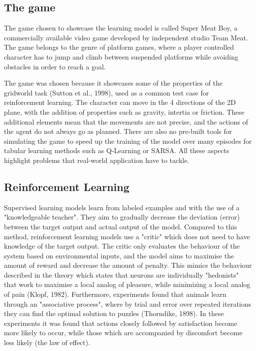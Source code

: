 \documentclass[10pt]{article}
\begin{document}
    \subsection{The game}

    The game chosen to showcase the learning model is called Super Meat Boy, a commercially available video game developed by independent studio Team Meat. The game belongs to the genre of platform games, where a player controlled character has to jump and climb between suspended platforms while avoiding obstacles in order to reach a goal.   

    The game was chosen because it showcases some of the properties of the gridworld task (Sutton et al., 1998), used as a common test case for reinforcement learning. The character can move in the 4 directions of the 2D plane, with the addition of properties such as gravity, intertia or friction. These additional elements mean that the movements are not precise, and the actions of the agent do not always go as planned. There are also no pre-built tools for simulating the game to speed up the training of the model over many episodes for tabular learning methods such as Q-Learning or SARSA. All these aspects highlight problems that real-world application have to tackle.

    \subsection{Reinforcement Learning}

    Supervised learning models learn from labeled examples and with the use of a "knowledgeable teacher". They aim to gradually decrease the deviation (error) between the target output and actual output of the model. Compared to this method, reinforcement learning models use a "critic" which does not need to have knowledge of the target output. The critic only evaluates the behaviour of the system based on environmental inputs, and the model aims to maximise the amount of reward and decrease the amount of penalty. This mimics the behaviour described in the theory which states that neurons are individually "hedonists" that work to maximise a local analog of pleasure, while minimizing a local analog of pain (Klopf, 1982). Furthermore, experiments found that animals learn through an "associative process", where by trial and error over repeated iterations they can find the optimal solution to puzzles (Thorndike, 1898). In these experiments it was found that actions closely followed by satisfaction become more likely to occur, while those which are accompanied by discomfort become less likely (the law of effect).
\end{document}
